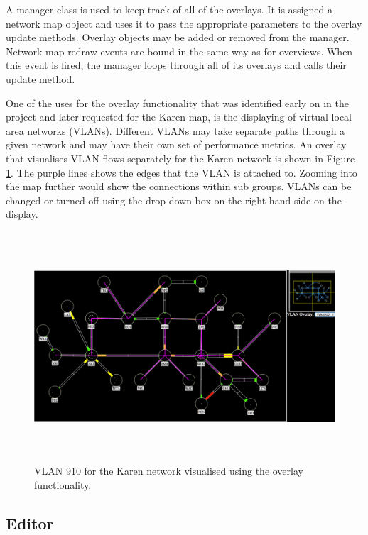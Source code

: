 \documentclass[11pt, a4paper]{article}
\begin{document}
A manager class is used to keep track of all of the overlays. It is assigned a
network map object and uses it to pass the appropriate parameters to the overlay
update methods. Overlay objects may be added or removed from the manager.
Network map redraw events are bound in the same way as for overviews. When this
event is fired, the manager loops through all of its overlays and calls their
update method. 

One of the uses for the overlay functionality that was identified early on in
the project and later requested for the Karen map, is the displaying of virtual
local area networks (VLANs). Different VLANs may take separate paths through a
given network and may have their own set of performance metrics. An overlay that
visualises VLAN flows separately for the Karen network is shown in Figure
\ref{fig:overlays1.0}. The purple lines shows the edges that the VLAN is
attached to. Zooming into the map further would show the connections within sub
groups. VLANs can be changed or turned off using the drop down box on the right
hand side on the display.

\begin{figure} 
\centering
\includegraphics[width=170mm,height=85.71mm]{assets/overlays1-0.pdf}
\caption{VLAN 910 for the Karen network visualised using the overlay
functionality.}
\label{fig:overlays1.0} 
\end{figure}

\subsection{Editor}
\label{sec:editor.impl}
\end{document}
